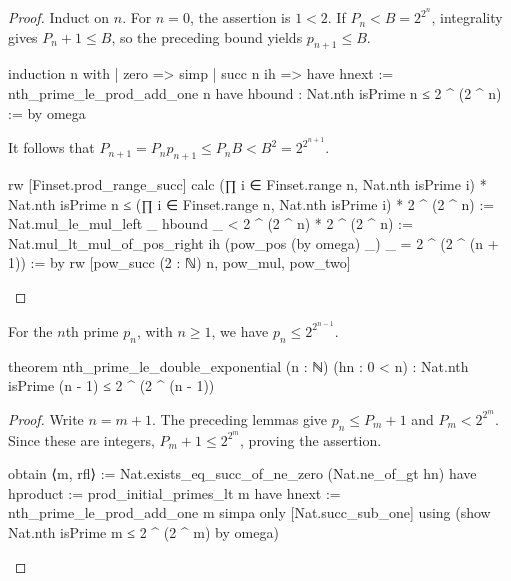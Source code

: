 \begin{proof}
  Induct on $n$.
  For $n=0$, the assertion is $1<2$.
  If $P_n< B=2^{2^n}$, integrality gives $P_n+1\le B$, so the preceding bound yields $p_{n+1}\le
    B$.

  \begin{lean}
    induction n with
    | zero => simp
    | succ n ih =>
      have hnext := nth_prime_le_prod_add_one n
      have hbound : Nat.nth isPrime n ≤ 2 ^ (2 ^ n) := by
        omega
  \end{lean}

  It follows that $P_{n+1}=P_np_{n+1}\le P_nB<B^2=2^{2^{n+1}}$.

  \begin{lean}
    rw [Finset.prod_range_succ]
    calc
      (∏ i ∈ Finset.range n, Nat.nth isPrime i) * Nat.nth isPrime n ≤
          (∏ i ∈ Finset.range n, Nat.nth isPrime i) * 2 ^ (2 ^ n) :=
        Nat.mul_le_mul_left _ hbound
      _ < 2 ^ (2 ^ n) * 2 ^ (2 ^ n) :=
        Nat.mul_lt_mul_of_pos_right ih (pow_pos (by omega) _)
      _ = 2 ^ (2 ^ (n + 1)) := by
        rw [pow_succ (2 : ℕ) n, pow_mul, pow_two]
  \end{lean}

\end{proof}

\begin{theorem}
  \label{ent:thm:nth-prime-double-exponential}
  For the $n$th prime $p_n$, with $n\ge1$, we have $p_n\le2^{2^{n-1}}$.

  \begin{lean}
    theorem nth_prime_le_double_exponential (n : ℕ) (hn : 0 < n) :
        Nat.nth isPrime (n - 1) ≤ 2 ^ (2 ^ (n - 1))
  \end{lean}
\end{theorem}

\begin{proof}
  Write $n=m+1$.
  The preceding lemmas give $p_n\le P_m+1$ and $P_m<2^{2^m}$.
  Since these are integers, $P_m+1\le2^{2^m}$, proving the assertion.

  \begin{lean}
    obtain ⟨m, rfl⟩ := Nat.exists_eq_succ_of_ne_zero (Nat.ne_of_gt hn)
    have hproduct := prod_initial_primes_lt m
    have hnext := nth_prime_le_prod_add_one m
    simpa only [Nat.succ_sub_one] using
      (show Nat.nth isPrime m ≤ 2 ^ (2 ^ m) by omega)
  \end{lean}

\end{proof}
